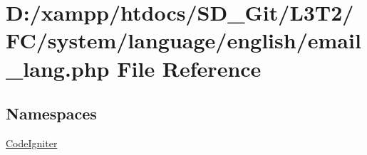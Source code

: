 \hypertarget{email__lang_8php}{}\section{D\+:/xampp/htdocs/\+S\+D\+\_\+\+Git/\+L3\+T2/\+F\+C/system/language/english/email\+\_\+lang.php File Reference}
\label{email__lang_8php}
\subsection*{Namespaces}
\begin{DoxyCompactItemize}
\item 
 \hyperlink{namespace_code_igniter}{Code\+Igniter}
\end{DoxyCompactItemize}
